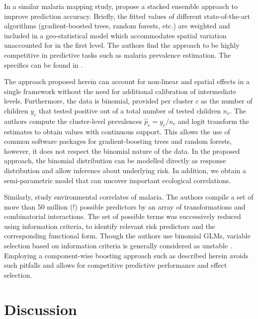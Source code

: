 In a similar malaria mapping study, \textcite{bhattImprovedPredictionAccuracy2017} propose a stacked ensemble approach to improve prediction accuracy. Briefly, the fitted values of different state-of-the-art algorithms (gradient-boosted trees, random forests, etc.) are weighted and included in a geo-statistical model which accommodates spatial variation unaccounted for in the first level. The authors find the approach to be highly competitive in predictive tasks such as malaria prevalence estimation. The specifics can be found in \textcite{bhattImprovedPredictionAccuracy2017}. 

The approach proposed herein can account for non-linear and spatial effects in a single framework without the need for additional calibration of intermediate levels. Furthermore, the data is binomial, provided per cluster $c$ as the number of children $y_c$ that tested positive out of a total number of tested children $n_c$. The authors compute the cluster-level prevalences $\hat{p}_c = y_c / n_c$ and logit transform the estimates to obtain values with continuous support. This allows the use of common software packages for gradient-boosting trees and random forests, however, it does not respect the binomial nature of the data. In the proposed approach, the binomial distribution can be modelled directly as response distribution and allow inference about underlying risk. In addition, we obtain a semi-parametric model that can uncover important ecological correlations. 

Similarly, \textcite{weissReexaminingEnvironmentalCorrelates2015} study environmental correlates of malaria. The authors compile a set of more than 50 million (!) possible predictors by an array of transformations and combinatorial interactions. The set of possible terms was successively reduced using information criteria, to identify relevant risk predictors and the corresponding functional form. Though the authors use binomial GLMs, variable selection based on information criteria is generally considered as unstable \autocite[see, for example, the discussion in][Section 2.2]{mayrGeneralizedAdditiveModels2012}. Employing a component-wise boosting approach such as described herein avoids such pitfalls and allows for competitive predictive performance and effect selection. 


\section{Discussion}\label{sec:discussion}

